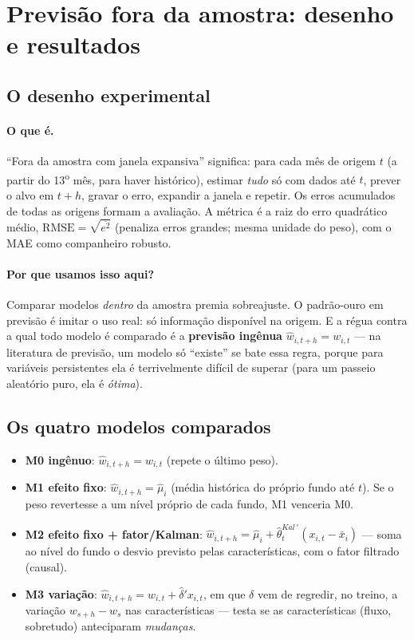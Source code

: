 \documentclass[11pt,a4paper]{article}
\newcommand{\porque}[0]{\paragraph{Por que usamos isso aqui?}}
\newcommand{\oquee}[0]{\paragraph{O que é.}}
\begin{document}
\section{Previsão fora da amostra: desenho e resultados}
\label{sec:oos}

\subsection{O desenho experimental}

\oquee ``Fora da amostra com janela expansiva'' significa: para cada mês de origem $t$ (a partir
do 13\textsuperscript{o} mês, para haver histórico), estimar \emph{tudo} só com dados até $t$,
prever o alvo em $t+h$, gravar o erro, expandir a janela e repetir. Os erros acumulados de todas
as origens formam a avaliação. A métrica é a raiz do erro quadrático médio,
$\mathrm{RMSE}=\sqrt{\overline{e^2}}$ (penaliza erros grandes; mesma unidade do peso), com o MAE
como companheiro robusto.

\porque Comparar modelos \emph{dentro} da amostra premia sobreajuste. O padrão-ouro em previsão é
imitar o uso real: só informação disponível na origem. E a régua contra a qual todo modelo é
comparado é a \textbf{previsão ingênua} $\widehat w_{i,t+h}=w_{i,t}$ --- na literatura de
previsão, um modelo só ``existe'' se bate essa regra, porque para variáveis persistentes ela é
terrivelmente difícil de superar (para um passeio aleatório puro, ela é \emph{ótima}).

\subsection{Os quatro modelos comparados}

\begin{itemize}[topsep=2pt,itemsep=1pt]
\item \textbf{M0 ingênuo}: $\widehat w_{i,t+h} = w_{i,t}$ (repete o último peso).
\item \textbf{M1 efeito fixo}: $\widehat w_{i,t+h} = \widehat\mu_i$ (média histórica do próprio
fundo até $t$). Se o peso revertesse a um nível próprio de cada fundo, M1 venceria M0.
\item \textbf{M2 efeito fixo + fator/Kalman}: $\widehat w_{i,t+h} = \widehat\mu_i +
\widehat\theta_t^{Kal\,\prime}(x_{i,t}-\bar x_i)$ --- soma ao nível do fundo o desvio previsto
pelas características, com o fator filtrado (causal).
\item \textbf{M3 variação}: $\widehat w_{i,t+h} = w_{i,t} + \widehat\delta'x_{i,t}$, em que
$\delta$ vem de regredir, no treino, a variação $w_{s+h}-w_s$ nas características --- testa se as
características (fluxo, sobretudo) anteciparam \emph{mudanças}.
\end{itemize}
\end{document}
